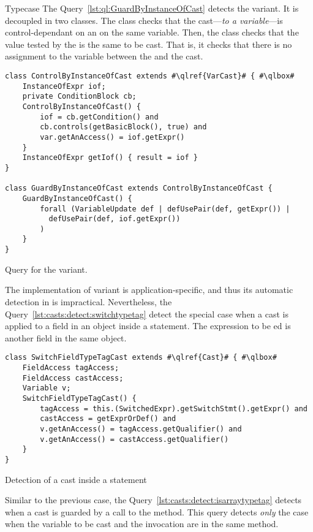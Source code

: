 \begin{pattern}{Typecase}
The Query~\ref{lst:ql:GuardByInstanceOfCast} detects the  variant.
It is decoupled in two \ql{} classes.
The  class checks that the cast---\emph{to a variable}---is control-dependant on an  on the same variable.
Then, the  class checks that the value tested by the  is the same to be cast.
That is, it checks that there is no assignment to the variable between the  and the cast.

\begin{listing}
\begin{verbatim}
class ControlByInstanceOfCast extends #\qlref{VarCast}# { #\qlbox#
	InstanceOfExpr iof;
	private ConditionBlock cb;
	ControlByInstanceOfCast() {
		iof = cb.getCondition() and
		cb.controls(getBasicBlock(), true) and
		var.getAnAccess() = iof.getExpr()
	}
	InstanceOfExpr getIof() { result = iof }
}

class GuardByInstanceOfCast extends ControlByInstanceOfCast {
	GuardByInstanceOfCast() {
		forall (VariableUpdate def | defUsePair(def, getExpr()) |
		  defUsePair(def, iof.getExpr())
		)
	}
}
\end{verbatim}
\caption{Query for the  variant.}
\label{lst:ql:GuardByInstanceOfCast}
\end{listing}

The implementation of  variant is application-specific,
and thus its automatic detection in \ql{} is impractical.
Nevertheless, the Query~\ref{lst:casts:detect:switchtypetag} detect the special case when a cast is applied to a field in an object inside a  statement.
The expression to be ed is another field in the same object.

\begin{listing}
\begin{verbatim}
class SwitchFieldTypeTagCast extends #\qlref{Cast}# { #\qlbox#
	FieldAccess tagAccess;
	FieldAccess castAccess;
	Variable v;
	SwitchFieldTypeTagCast() {
		tagAccess = this.(SwitchedExpr).getSwitchStmt().getExpr() and
		castAccess = getExprOrDef() and
		v.getAnAccess() = tagAccess.getQualifier() and
		v.getAnAccess() = castAccess.getQualifier()
	}
}
\end{verbatim}
\caption{Detection of a cast inside a  statement}
\label{lst:casts:detect:switchtypetag}
\end{listing}

Similar to the previous case,
the Query~\ref{lst:casts:detect:isarraytypetag} detects when a cast is guarded by a call to the  method.
This query detects \emph{only} the case when the variable to be cast and
the  invocation are in the same method.


\end{pattern}
